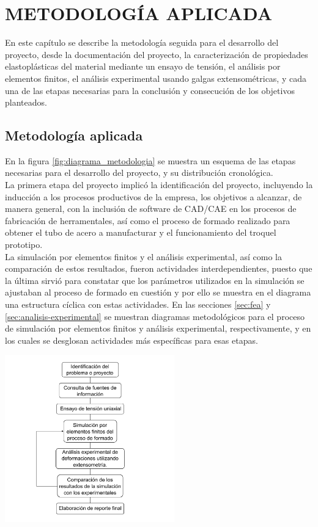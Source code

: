 \chapter{METODOLOGÍA APLICADA}

En este capítulo se describe la metodología seguida para el desarrollo del proyecto, 
desde la documentación del proyecto, la caracterización de propiedades elastoplásticas 
del material mediante un ensayo de tensión, el análisis por elementos finitos, 
el análisis experimental usando galgas extensométricas, y cada una de las etapas 
necesarias para la conclusión y consecución de los objetivos planteados. 

\section{Metodología aplicada}

En la figura \ref{fig:diagrama_metodologia} se muestra un esquema de las etapas necesarias 
para el desarrollo del proyecto, y su distribución cronológica.\\

La primera etapa del proyecto implicó la identificación del proyecto, incluyendo la 
inducción a los procesos productivos de la empresa, los objetivos a alcanzar, de manera general, 
con la inclusión de software de CAD/CAE en los procesos de fabricación de herramentales, 
así como el proceso de formado realizado para obtener el tubo de acero a manufacturar 
y el funcionamiento del troquel prototipo.\\

La simulación por elementos finitos y el análisis experimental, así como la 
comparación de estos resultados, fueron actividades interdependientes, puesto que la 
última sirvió para constatar que los parámetros utilizados en la simulación se 
ajustaban al proceso de formado en cuestión y por ello se muestra en el diagrama 
una estructura cíclica con estas actividades. En las secciones \ref{sec:fea} y \ref{sec:analisis-experimental} 
se muestran diagramas metodológicos para el proceso de simulación por elementos finitos y análisis experimental, 
respectivamente, y en los cuales se desglosan actividades más específicas para esas etapas.

\begin{center}
\includegraphics[width=0.55\textwidth]{src/ch3/diagrama_metodologia.pdf}
\label{fig:diagrama_metodologia}
\end{center}

